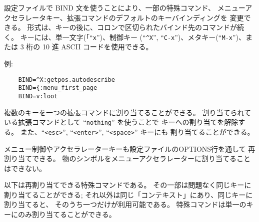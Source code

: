 設定ファイルで BIND 文を使うことにより、一部の特殊コマンド、
メニューアクセラレータキー、拡張コマンドのデフォルトのキーバインディングを
変更できる。
形式は、キーの後に、コロンで区切られたバインド先のコマンドが続く。
キーには、単一文字(「``{\tt x}'')、制御キー
(``{\tt \^{}X}'', ``{\tt C-x}'')、メタキー(``{\tt M-x}'')、または 3 桁の
10 進 ASCII コードを使用できる。

例:

\begin{verbatim}
    BIND=^X:getpos.autodescribe
    BIND={:menu_first_page
    BIND=v:loot
\end{verbatim}

\blist{}
\item[\tb{拡張コマンドキー}]
複数のキーを一つの拡張コマンドに割り当てることができる。
割り当てられている拡張コマンドとして ``{\tt nothing}'' を使うことで
キーへの割り当てを解除する。
また、``{\tt <esc>}'', ``{\tt <enter>}'', ``{\tt <space>}'' キーにも
割り当てることができる。

\item[\tb{メニューアクセラレーターキー}]
メニュー制御やアクセラレーターキーも設定ファイルのOPTIONS行を通して
再割り当てできる。
物のシンボルをメニューアクセラレーターに割り当てることはできない。

\item[\tb{特殊コマンドキー}]
以下は再割り当てできる特殊コマンドである。
その一部は問題なく同じキーに割り当てることができる;
それ以外は同じ「コンテキスト」にあり、同じキーに割り当てると、
そのうち一つだけが利用可能である。
特殊コマンドは単一のキーにのみ割り当てることができる。
\elist


